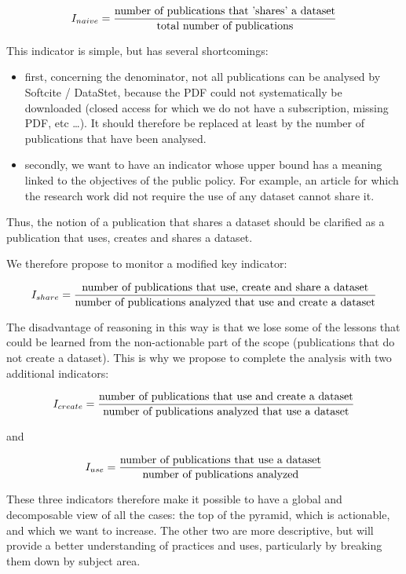 \documentclass[
]{article}
\begin{document}
\[ I_{naive} = {\text{number of publications that 'shares' a dataset} \over \text{total number of publications}} \]

This indicator is simple, but has several shortcomings:

\begin{itemize}
\item
  first, concerning the denominator, not all publications can be
  analysed by Softcite / DataStet, because the PDF could not
  systematically be downloaded (closed access for which we do not have a
  subscription, missing PDF, etc \ldots). It should therefore be
  replaced at least by the number of publications that have been
  analysed.
\item
  secondly, we want to have an indicator whose upper bound has a meaning
  linked to the objectives of the public policy. For example, an article
  for which the research work did not require the use of any dataset
  cannot share it.
\end{itemize}

Thus, the notion of a publication that shares a dataset should be
clarified as a publication that uses, creates and shares a dataset.

We therefore propose to monitor a modified key indicator:

\[ I_{share} = {\text{number of publications that use, create and share a dataset} \over \text{number of publications analyzed that use and create a dataset}} \]

The disadvantage of reasoning in this way is that we lose some of the
lessons that could be learned from the non-actionable part of the scope
(publications that do not create a dataset). This is why we propose to
complete the analysis with two additional indicators:

\[ I_{create} = {\text{number of publications that use and create a dataset} \over \text{number of publications analyzed that use a dataset}} \]

and

\[ I_{use} = {\text{number of publications that use a dataset} \over \text{number of publications analyzed}} \]

These three indicators therefore make it possible to have a global and
decomposable view of all the cases: the top of the pyramid, which is
actionable, and which we want to increase. The other two are more
descriptive, but will provide a better understanding of practices and
uses, particularly by breaking them down by subject area.
\end{document}
